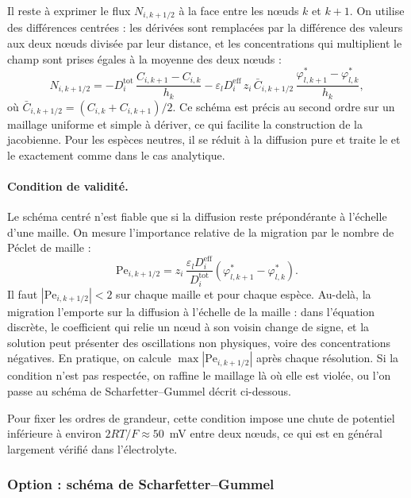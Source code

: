 Il reste à exprimer le flux $N_{i,k+1/2}$ à la face entre les nœuds $k$ et
$k+1$. On utilise des différences centrées : les dérivées sont remplacées par
la différence des valeurs aux deux nœuds divisée par leur distance, et les
concentrations qui multiplient le champ sont prises égales à la moyenne des
deux nœuds :
\begin{equation}
N_{i,k+1/2} =
- D_i^{\mathrm{tot}}\,\frac{C_{i,k+1} - C_{i,k}}{h_k}
- \varepsilon_l D_i^{\mathrm{eff}}\, z_i\, \bar{C}_{i,k+1/2}\,
\frac{\varphi_{l,k+1}^* - \varphi_{l,k}^*}{h_k},
\label{eq:flux_centre}
\end{equation}
où $\bar{C}_{i,k+1/2} = (C_{i,k} + C_{i,k+1})/2$. Ce schéma est précis au
second ordre sur un maillage uniforme et simple à dériver, ce qui facilite la
construction de la jacobienne. Pour les espèces neutres, il
se réduit à la diffusion pure et traite le  et le  exactement
comme dans le cas analytique.

\paragraph{Condition de validité.} Le schéma centré n'est fiable que si la
diffusion reste prépondérante à l'échelle d'une maille. On mesure
l'importance relative de la migration par le nombre de Péclet de maille :
\begin{equation}
\mathrm{Pe}_{i,k+1/2} = z_i\,\frac{\varepsilon_l D_i^{\mathrm{eff}}}{D_i^{\mathrm{tot}}}
\left(\varphi_{l,k+1}^* - \varphi_{l,k}^*\right) .
\label{eq:peclet_maille}
\end{equation}
Il faut $|\mathrm{Pe}_{i,k+1/2}| < 2$ sur chaque maille et pour chaque espèce.
Au-delà, la migration l'emporte sur la diffusion à l'échelle de
la maille : dans l'équation discrète, le coefficient qui relie un nœud à son
voisin change de signe, et la solution peut présenter des oscillations non
physiques, voire des concentrations négatives. En pratique, on calcule
$\max|\mathrm{Pe}_{i,k+1/2}|$ après chaque résolution. Si la condition n'est pas
respectée, on raffine le maillage là où elle est violée, ou l'on passe au
schéma de Scharfetter--Gummel décrit ci-dessous.

Pour fixer les ordres de grandeur, cette condition impose une chute de
potentiel inférieure à environ $2RT/F \approx 50$~mV entre deux nœuds, ce qui
est en général largement vérifié dans l'électrolyte.

\subsubsection*{Option : schéma de Scharfetter--Gummel}

